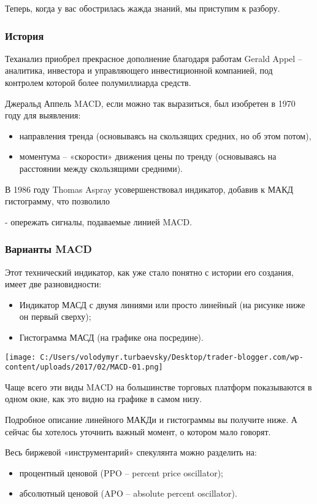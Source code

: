 \documentclass[a5paper]{article}
\begin{document}
Теперь, когда у вас обострилась жажда знаний, мы приступим к разбору.

\subsubsection{История}

Теханализ приобрел прекрасное дополнение благодаря работам Gerald Appel – аналитика, инвестора и управляющего инвестиционной компанией, под контролем которой более полумиллиарда средств.

Джеральд Аппель MACD, если можно так выразиться, был изобретен в 1970 году для выявления:
\begin{itemize}
\item     направления тренда (основываясь на скользящих средних, но об этом потом),
\item     моментума – «скорости» движения цены по тренду (основываясь на расстоянии между скользящими средними).
\end{itemize}

В 1986 году Thomas Aspray усовершенствовал индикатор, добавив к МАКД гистограмму, что позволило

    -       опережать сигналы, подаваемые линией MACD.

\subsubsection{Варианты MACD}

Этот технический индикатор, как уже стало понятно с истории его создания, имеет две разновидности:
\begin{itemize}
\item     Индикатор МАСД с двумя линиями или просто линейный (на рисунке ниже он первый сверху);
\item     Гистограмма МАСД (на графике она посредине).
\end{itemize}

\texttt{[image: C:/Users/volodymyr.turbaevsky/Desktop/trader-blogger.com/wp-content/uploads/2017/02/MACD-01.png]}

Чаще всего эти виды MACD на большинстве торговых платформ показываются в одном окне, как это видно на графике в самом низу.

Подробное описание линейного МАКДи и гистограммы вы получите ниже. А сейчас бы хотелось уточнить важный момент, о котором мало говорят.

Весь биржевой «инструментарий» спекулянта можно разделить на:
\begin{itemize}
\item     процентный ценовой (PPO – percent price oscillator);
\item     абсолютный ценовой (APO – absolute percent oscillator).
\end{itemize}
\end{document}
